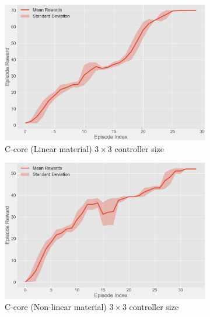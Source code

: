 \begin{figure}[h!]
    \centering
    \begin{subfigure}{0.45\textwidth}
        \centering
        \includegraphics[width=\linewidth]{Figures/Ch_MDP/c_core_linear_training2.png}
        \caption{C-core (Linear material) $3 \times 3$ controller size}
        \label{fig:c_core_linear_training_rewards}  
    \end{subfigure}
    \begin{subfigure}{0.45\textwidth}
        \centering
        \includegraphics[width=\linewidth]{Figures/Ch_MDP/c_core_non_linear_training2.png}
        \caption{C-core (Non-linear material) $3 \times 3$ controller size}
        \label{fig:c_core_nonlinear_training_rewards}  
    \end{subfigure}
    \begin{subfigure}{0.65\textwidth}
        \centering

\end{subfigure}
\end{figure}
